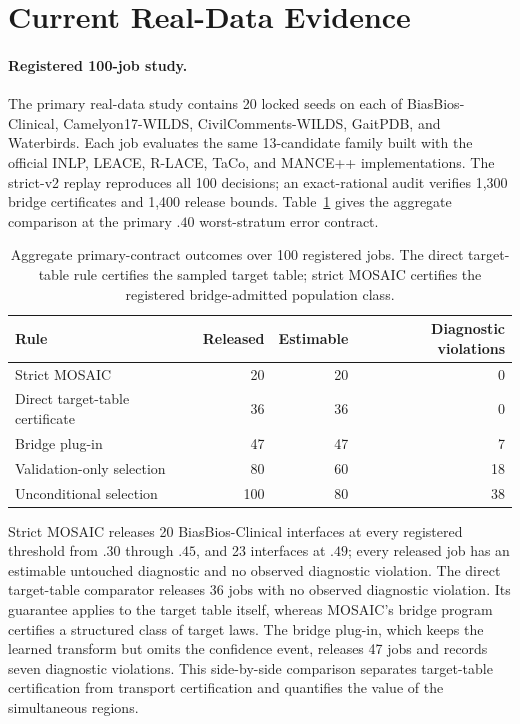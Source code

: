 \section{Current Real-Data Evidence}

\paragraph{Registered 100-job study.}
The primary real-data study contains 20 locked seeds on each of BiasBios-Clinical,
Camelyon17-WILDS, CivilComments-WILDS, GaitPDB, and Waterbirds. Each job evaluates
the same 13-candidate family built with the official INLP, LEACE, R-LACE, TaCo,
and MANCE++ implementations. The strict-v2 replay reproduces all 100 decisions;
an exact-rational audit verifies 1,300 bridge certificates and 1,400 release
bounds. Table~\ref{supp:tab:current-real-rules} gives the aggregate comparison
at the primary $.40$ worst-stratum error contract.

\begin{table}[t]
\centering
\small
\setlength{\tabcolsep}{3.7pt}
\begin{tabular}{lrrr}
\hline
Rule & Released & Estimable & Diagnostic violations \\
\hline
Strict MOSAIC & 20 & 20 & 0 \\
Direct target-table certificate & 36 & 36 & 0 \\
Bridge plug-in & 47 & 47 & 7 \\
Validation-only selection & 80 & 60 & 18 \\
Unconditional selection & 100 & 80 & 38 \\
\hline
\end{tabular}
\caption{Aggregate primary-contract outcomes over 100 registered jobs. The
direct target-table rule certifies the sampled target table; strict MOSAIC
certifies the registered bridge-admitted population class.}
\label{supp:tab:current-real-rules}
\end{table}

Strict MOSAIC releases 20 BiasBios-Clinical interfaces at every registered
threshold from $.30$ through $.45$, and 23 interfaces at $.49$; every released
job has an estimable untouched diagnostic and no observed diagnostic violation.
The direct target-table comparator releases 36 jobs with no observed diagnostic
violation. Its guarantee applies to the target table itself, whereas MOSAIC's
bridge program certifies a structured class of target laws. The bridge plug-in,
which keeps the learned transform but omits the confidence event, releases 47
jobs and records seven diagnostic violations. This side-by-side comparison
separates target-table certification from transport certification and quantifies
the value of the simultaneous regions.

